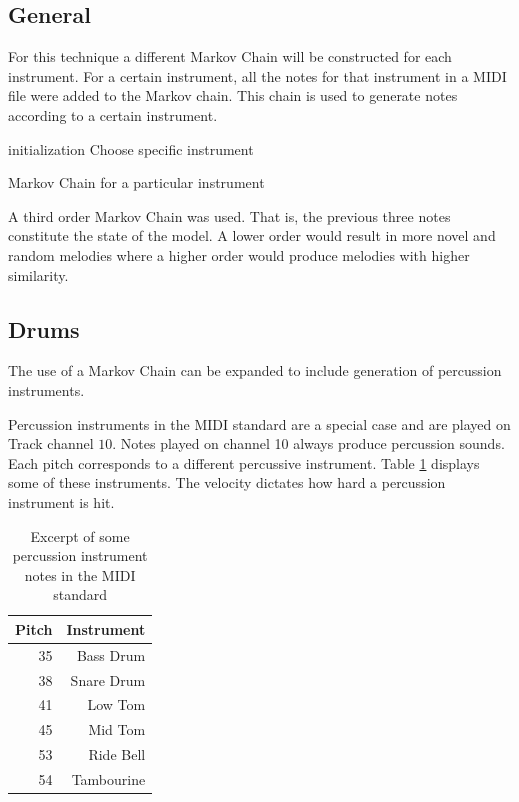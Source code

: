 \subsection{General}
For this technique a different Markov Chain will be constructed for each instrument. 
For a certain instrument, all the notes for that instrument in a MIDI file were added to the Markov chain. This chain is used to generate notes according to a certain instrument.
\begin{algorithm}
 initialization\;
 Choose specific instrument\;
 \caption{Markov Chain for a particular instrument}
 \label{algo:instrumm}
\end{algorithm}

A third order Markov Chain was used. That is, the previous three notes constitute the state of the model. A lower order would result in more novel and random melodies where a higher order would produce melodies with higher similarity.

\subsection{Drums}
The use of a Markov Chain can be expanded to include generation of percussion instruments. 

Percussion instruments in the MIDI standard are a special case and are played on Track channel $10$. Notes played on channel 10 always produce percussion sounds. Each pitch corresponds to a different percussive instrument. Table \ref{tab:percuspitchesexcerpt} displays some of these instruments. The velocity dictates how hard a percussion instrument is hit.

\begin{table}[htbp]
  \centering
  \caption{Excerpt of some percussion instrument notes in the \ac{MIDI} standard}
    \begin{tabular}{r|r}
    \toprule
    Pitch & Instrument\\
    \midrule
    35    & Bass Drum \\
    38    & Snare Drum \\
    41    & Low Tom \\
    45    & Mid Tom \\
    53    & Ride Bell \\
    54    & Tambourine \\
    \bottomrule
    \end{tabular}%
  \label{tab:percuspitchesexcerpt}%
\end{table}%

